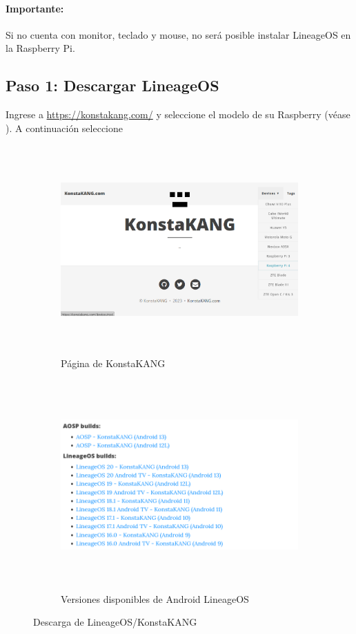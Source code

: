 \documentclass[letterpaper,10.5pt]{article}
\begin{document}
\paragraph*{Importante:} Si no cuenta con monitor, teclado y mouse, no será posible instalar LineageOS en la Raspberry Pi.

%
%
\subsection{Paso 1: Descargar LineageOS}%
\label{sec:step1}
Ingrese a \url{https://konstakang.com/} y seleccione el modelo de su Raspberry (véase ).
A continuación seleccione

\begin{figure}[H]
	\centering%
	\begin{subfigure}[b]{0.5\linewidth}
		\centering
		\includegraphics[width=0.9\linewidth,height=8cm,keepaspectratio]{img/p02-01a.png} %
		\caption{Página de KonstaKANG}
		\label{fig:konstaKANG-web} %
	\end{subfigure}%
	\begin{subfigure}[b]{0.5\linewidth}
		\centering
		\includegraphics[width=0.9\linewidth,height=8cm,keepaspectratio]{img/p02-01b.png} %
		\caption{Versiones disponibles de Android LineageOS}
		\label{fig:lineage-flavors} %
	\end{subfigure}
	\caption{Descarga de LineageOS/KonstaKANG}%
	\label{fig:lineage-download} %
\end{figure}
\end{document}
